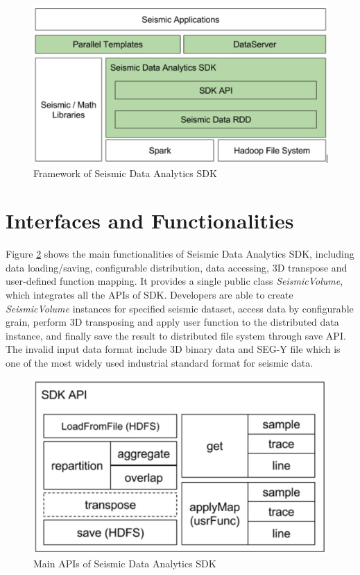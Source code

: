 \begin{figure}[h]
\centering
\includegraphics[scale=0.6]{figures/sdk_framework.png}
\caption{Framework of Seismic Data Analytics SDK}
\label{sdk_framework}
\end{figure}


\section{Interfaces and Functionalities}

Figure \ref{sdk_interface} shows the main functionalities of Seismic Data Analytics SDK, including data loading/saving, configurable distribution, data accessing, 3D transpose and user-defined function mapping. It provides a single public class \emph{SeismicVolume}, which integrates all the APIs of SDK. Developers are able to create \emph{SeismicVolume} instances for specified seismic dataset, access data by configurable grain, perform 3D transposing and apply user function to the distributed data instance, and finally save the result to distributed file system through save API. The invalid input data format include 3D binary data and SEG-Y file \cite{SEGDREV21} which is one of the most widely used industrial standard format for seismic data.

\begin{figure}[h]
\centering
\includegraphics[scale=0.6]{figures/sdk_interface.png}
\caption{Main APIs of Seismic Data Analytics SDK}
\label{sdk_interface}
\end{figure}

